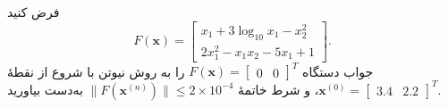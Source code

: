 فرض کنید
\[F(\textbf{x}) = \begin{bmatrix}
	x_1+3\log_{10} x_1 -x_2^2 \\ 2x_1^2 -x_1x_2 -5x_1 +1 
\end{bmatrix}.\]
جواب دستگاه 
\(F(\textbf{x}) = \begin{bmatrix}
0 &0
\end{bmatrix}^T\)
را به روش نیوتن با شروع از نقطهٔ 
\(\textbf{x}^{(0)} = \begin{bmatrix}
3.4 & 2.2
\end{bmatrix}^T\)،
و شرط خاتمهٔ
\(\|F(\textbf{x}^{(n)})\|\leq 2 \times 10^{-4}\)
به‌دست بیاورید.
